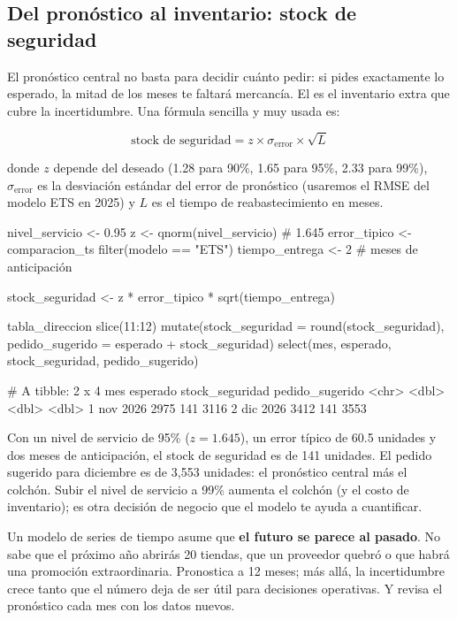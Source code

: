\subsection{Del pronóstico al inventario: stock de seguridad}

El pronóstico central no basta para decidir cuánto pedir: si pides exactamente
lo esperado, la mitad de los meses te faltará mercancía. El
 es el inventario extra que cubre la
incertidumbre. Una fórmula sencilla y muy usada es:

\[
\text{stock de seguridad} = z \times \sigma_{\text{error}} \times \sqrt{L}
\]

donde $z$ depende del  deseado (1.28 para 90\%,
1.65 para 95\%, 2.33 para 99\%), $\sigma_{\text{error}}$ es la desviación
estándar del error de pronóstico (usaremos el RMSE del modelo ETS en 2025) y
$L$ es el tiempo de reabastecimiento en meses.

\begin{rcode}
nivel_servicio <- 0.95
z <- qnorm(nivel_servicio)                 # 1.645
error_tipico <- comparacion_ts %
  filter(modelo == "ETS") %
tiempo_entrega <- 2                        # meses de anticipación

stock_seguridad <- z * error_tipico * sqrt(tiempo_entrega)

tabla_direccion %
  slice(11:12) %
  mutate(stock_seguridad = round(stock_seguridad),
         pedido_sugerido = esperado + stock_seguridad) %
  select(mes, esperado, stock_seguridad, pedido_sugerido)
\end{rcode}

\begin{rsalida}
# A tibble: 2 x 4
  mes      esperado stock_seguridad pedido_sugerido
  <chr>       <dbl>           <dbl>           <dbl>
1 nov 2026     2975             141            3116
2 dic 2026     3412             141            3553
\end{rsalida}

Con un nivel de servicio de 95\% ($z = 1.645$), un error típico de 60.5
unidades y dos meses de anticipación, el stock de seguridad es de 141
unidades. El pedido sugerido para diciembre es de 3{,}553 unidades: el
pronóstico central más el colchón. Subir el nivel de servicio a 99\% aumenta el
colchón (y el costo de inventario); es otra decisión de negocio que el
modelo te ayuda a cuantificar.

\begin{advertencia}
Un modelo de series de tiempo asume que \textbf{el futuro se parece al
pasado}. No sabe que el próximo año abrirás 20 tiendas, que un proveedor
quebró o que habrá una promoción extraordinaria. Pronostica a 12 meses; más
allá, la incertidumbre crece tanto que el número deja de ser útil para
decisiones operativas. Y revisa el pronóstico cada mes con los datos nuevos.
\end{advertencia}

